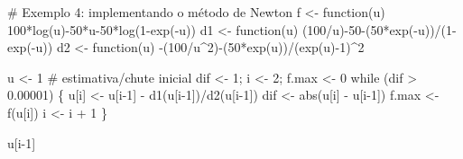 \documentclass[
  letterpaper,
  DIV=11,
  numbers=noendperiod]{scrreprt}
\newenvironment{Shaded}{\begin{snugshade}}{\end{snugshade}}
\newcommand{\CommentTok}[1]{\textcolor[rgb]{0.37,0.37,0.37}{#1}}
\newcommand{\ControlFlowTok}[1]{\textcolor[rgb]{0.00,0.23,0.31}{#1}}
\newcommand{\DecValTok}[1]{\textcolor[rgb]{0.68,0.00,0.00}{#1}}
\newcommand{\FloatTok}[1]{\textcolor[rgb]{0.68,0.00,0.00}{#1}}
\newcommand{\FunctionTok}[1]{\textcolor[rgb]{0.28,0.35,0.67}{#1}}
\newcommand{\NormalTok}[1]{\textcolor[rgb]{0.00,0.23,0.31}{#1}}
\newcommand{\OtherTok}[1]{\textcolor[rgb]{0.00,0.23,0.31}{#1}}
\newcommand{\SpecialCharTok}[1]{\textcolor[rgb]{0.37,0.37,0.37}{#1}}
\begin{document}
\begin{Shaded}
\begin{Highlighting}[]
\CommentTok{\# Exemplo 4: implementando o método de Newton}
\NormalTok{f  }\OtherTok{\textless{}{-}} \ControlFlowTok{function}\NormalTok{(u) }\DecValTok{100}\SpecialCharTok{*}\FunctionTok{log}\NormalTok{(u)}\SpecialCharTok{{-}}\DecValTok{50}\SpecialCharTok{*}\NormalTok{u}\DecValTok{{-}50}\SpecialCharTok{*}\FunctionTok{log}\NormalTok{(}\DecValTok{1}\SpecialCharTok{{-}}\FunctionTok{exp}\NormalTok{(}\SpecialCharTok{{-}}\NormalTok{u))}
\NormalTok{d1 }\OtherTok{\textless{}{-}} \ControlFlowTok{function}\NormalTok{(u) (}\DecValTok{100}\SpecialCharTok{/}\NormalTok{u)}\SpecialCharTok{{-}}\DecValTok{50}\SpecialCharTok{{-}}\NormalTok{(}\DecValTok{50}\SpecialCharTok{*}\FunctionTok{exp}\NormalTok{(}\SpecialCharTok{{-}}\NormalTok{u))}\SpecialCharTok{/}\NormalTok{(}\DecValTok{1}\SpecialCharTok{{-}}\FunctionTok{exp}\NormalTok{(}\SpecialCharTok{{-}}\NormalTok{u))}
\NormalTok{d2 }\OtherTok{\textless{}{-}} \ControlFlowTok{function}\NormalTok{(u) }\SpecialCharTok{{-}}\NormalTok{(}\DecValTok{100}\SpecialCharTok{/}\NormalTok{u}\SpecialCharTok{\^{}}\DecValTok{2}\NormalTok{)}\SpecialCharTok{{-}}\NormalTok{(}\DecValTok{50}\SpecialCharTok{*}\FunctionTok{exp}\NormalTok{(u))}\SpecialCharTok{/}\NormalTok{(}\FunctionTok{exp}\NormalTok{(u)}\SpecialCharTok{{-}}\DecValTok{1}\NormalTok{)}\SpecialCharTok{\^{}}\DecValTok{2}

\NormalTok{u }\OtherTok{\textless{}{-}} \DecValTok{1} \CommentTok{\# estimativa/chute inicial }
\NormalTok{dif }\OtherTok{\textless{}{-}} \DecValTok{1}\NormalTok{; i }\OtherTok{\textless{}{-}} \DecValTok{2}\NormalTok{; f.max }\OtherTok{\textless{}{-}} \DecValTok{0}
\ControlFlowTok{while}\NormalTok{ (dif }\SpecialCharTok{\textgreater{}} \FloatTok{0.00001}\NormalTok{) \{}
\NormalTok{  u[i] }\OtherTok{\textless{}{-}}\NormalTok{ u[i}\DecValTok{{-}1}\NormalTok{] }\SpecialCharTok{{-}} \FunctionTok{d1}\NormalTok{(u[i}\DecValTok{{-}1}\NormalTok{])}\SpecialCharTok{/}\FunctionTok{d2}\NormalTok{(u[i}\DecValTok{{-}1}\NormalTok{])}
\NormalTok{  dif }\OtherTok{\textless{}{-}} \FunctionTok{abs}\NormalTok{(u[i] }\SpecialCharTok{{-}}\NormalTok{ u[i}\DecValTok{{-}1}\NormalTok{])}
\NormalTok{  f.max }\OtherTok{\textless{}{-}} \FunctionTok{f}\NormalTok{(u[i])}
\NormalTok{  i }\OtherTok{\textless{}{-}}\NormalTok{ i }\SpecialCharTok{+} \DecValTok{1}
\NormalTok{\}}

\NormalTok{u[i}\DecValTok{{-}1}\NormalTok{]}
\end{Highlighting}
\end{Shaded}
\end{document}
